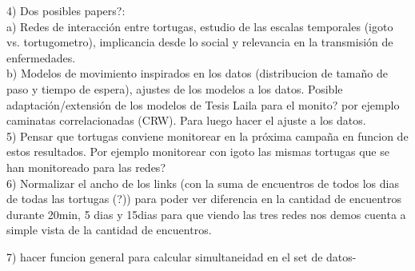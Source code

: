 \documentclass[12pt,screen,twoside,pagebackref]{ibtesis}
\begin{document}
4) Dos posibles papers?: \\
    a) Redes de interacción entre tortugas, estudio de las escalas temporales (igoto vs. tortugometro), 
    implicancia desde lo social y relevancia en la transmisión de enfermedades.\\
    b) Modelos de movimiento inspirados en los datos (distribucion de tamaño de paso y tiempo de espera), 
    ajustes de los modelos a los datos. Posible adaptación/extensión de los modelos de Tesis Laila para el monito? 
    por ejemplo caminatas correlacionadas (CRW). Para luego hacer el ajuste a los datos.\\

5) Pensar que tortugas conviene monitorear en la próxima campaña en funcion de estos resultados. Por ejemplo
monitorear con igoto las mismas tortugas que se han monitoreado para las redes?\\

6) Normalizar el ancho de los links (con la suma de encuentros de todos los dias de todas las tortugas (?)) para poder ver diferencia en la cantidad de encuentros durante 20min, 5 dias y 15dias
para que viendo las tres redes nos demos cuenta a simple vista de la cantidad de encuentros.

7) hacer funcion general para calcular simultaneidad en el set de datos-


  


    
    
    
    
\end{document}
